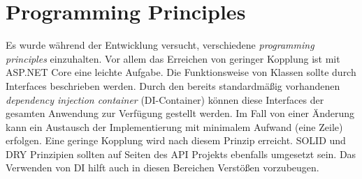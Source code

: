 \part{Programming Principles}
Es wurde während der Entwicklung versucht,
verschiedene \textit{programming principles} einzuhalten.
Vor allem das Erreichen von geringer Kopplung ist mit
ASP.NET Core eine leichte Aufgabe.
Die Funktionsweise von Klassen sollte durch Interfaces beschrieben werden.
Durch den bereits standardmäßig vorhandenen \textit{dependency injection container} (DI-Container)
können diese Interfaces der gesamten Anwendung zur Verfügung gestellt werden.
Im Fall von einer Änderung kann ein Austausch der
Implementierung mit minimalem Aufwand (eine Zeile) erfolgen.
Eine geringe Kopplung wird nach diesem Prinzip erreicht.
SOLID und DRY Prinzipien sollten auf Seiten des API Projekts ebenfalls umgesetzt sein.
Das Verwenden von DI hilft auch in diesen Bereichen Verstößen vorzubeugen.